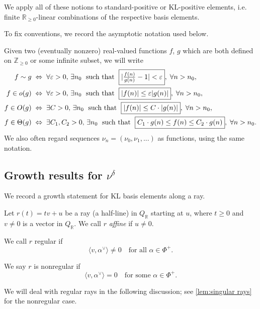 \documentclass[a4paper,11pt]{amsart}
\renewcommand{\dots}{\text{...}}
\newcommand{\R}{\mathbb{R}}
\newcommand{\N}{\mathbb{Z}_{\geq 0}}
\numberwithin{equation}{subsection}
\theoremstyle{definition}
\theoremstyle{remark}
\begin{document}
We apply all of these notions to standard-positive or KL-positive elements,
i.e. finite $\R_{\geq 0}$-linear combinations of the respective basis
elements.

To fix conventions, we record the asymptotic notation used below.

\begin{Notation}
Given two (eventually nonzero) real-valued functions $f$, $g$ which are both defined on $\N$ or
some infinite subset, we will write
\begin{gather*}
\begin{aligned}
f\sim g
&\;\Leftrightarrow\;
\forall\varepsilon>0,\,\exists n_{0}
\;\text{ such that }\;
\fbox{$|\tfrac{f(n)}{g(n)}-1|<\varepsilon$},
\;\forall n>n_{0}
,
\\
f\in o(g)
&\;\Leftrightarrow\;
\forall\varepsilon>0,\,\exists n_{0}
\;\text{ such that }\;
\fbox{\(|f(n)|\leq \varepsilon |g(n)|\)},
\;\forall n>n_{0}
,
\\
f\in O(g)
&\;\Leftrightarrow\;
\exists C>0,\,\exists n_{0}
\;\text{ such that }\;
\fbox{$|f(n)|\leq C\cdot |g(n)|$},
\;\forall n>n_{0}
,
\\
f\in\Theta(g)
&\;\Leftrightarrow\;
\exists C_{1},C_{2}>0,\,\exists n_{0}
\;\text{ such that }\;
\fbox{$C_{1}\cdot g(n)\leq f(n)\leq C_{2}\cdot g(n)$},
\;\forall n>n_{0}
.
\\
\end{aligned}
\end{gather*}
We also often regard sequences $\nu_n=(\nu_0,\nu_1,\dots)$ as functions,
using the same notation.
\end{Notation}

\subsection{Growth results for \texorpdfstring{$\nu^\delta$}{nudelta}}\label{sec:poly}

We record a growth statement for KL basis elements along a ray. 

Let \(r(t)=tv + u\) be a ray (a half-line) in $Q_{\R}$ starting at $u$, where \(t\geq 0\) and \(v\not=0\) is a vector in $Q_{\R}$. We call $r$ \textit{affine} if $u \neq 0$.

We call \(r\) regular if 
\[
\langle v,\alpha^\vee\rangle\neq 0
\quad
\text{for all }\alpha\in \Phi^+.
\]

We say $r$ is nonregular if 
\[\langle v,\alpha^\vee\rangle= 0
\quad
\text{for some }\alpha\in \Phi^+.\]

We will deal with regular rays in the following discussion; see
\autoref{lem:singular rays} for the nonregular case.
\end{document}
